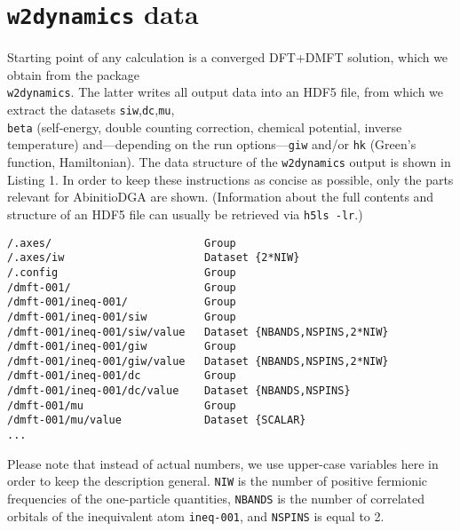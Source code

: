 \documentclass[a4paper,11pt]{article}
\numberwithin{equation}{section} %
\begin{document}
\section{\protect\Verb+w2dynamics+ data}
Starting point of any calculation is a converged DFT+DMFT solution, which we obtain from the package \\
\verb|w2dynamics|. The latter writes all output data into an HDF5 file, from which we extract the datasets \verb|siw|,\verb|dc|,\verb|mu|,\\
\verb|beta|  (self-energy, double counting correction, chemical potential, inverse temperature) 
and---depending on the run options---\verb|giw| and/or \verb|hk| (Green's function, Hamiltonian). 
The data structure of the \verb|w2dynamics| output is shown in Listing 1.
In order to keep these instructions as concise as possible, only the parts relevant for AbinitioDGA are shown. 
(Information about the full contents and structure of an HDF5 file can usually be retrieved via  \verb|h5ls -lr|.)
\begin{lstlisting}[caption=HDF5-structure of the DMFT output, frame=single, basicstyle=\small]
/.axes/                        Group
/.axes/iw                      Dataset {2*NIW}
/.config                       Group
/dmft-001/                     Group
/dmft-001/ineq-001/            Group
/dmft-001/ineq-001/siw         Group
/dmft-001/ineq-001/siw/value   Dataset {NBANDS,NSPINS,2*NIW}
/dmft-001/ineq-001/giw         Group
/dmft-001/ineq-001/giw/value   Dataset {NBANDS,NSPINS,2*NIW}
/dmft-001/ineq-001/dc          Group
/dmft-001/ineq-001/dc/value    Dataset {NBANDS,NSPINS}
/dmft-001/mu                   Group
/dmft-001/mu/value             Dataset {SCALAR}
...
\end{lstlisting}
Please note that instead of actual numbers, we use upper-case variables here in order to keep
the description general. \verb|NIW| is the number of positive fermionic frequencies of the one-particle quantities,
\verb|NBANDS| is the number of correlated orbitals of the inequivalent atom \verb|ineq-001|, and \verb|NSPINS| is equal to 2.
\end{document}
